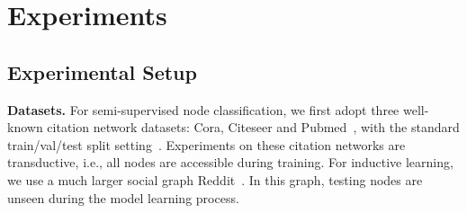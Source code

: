 \vspace{-5pt}
\section{Experiments}\label{sect_exp}
\vspace{-5pt}
\subsection{Experimental Setup}\label{sec_exp_setup}
\vspace{-5pt}
\textbf{Datasets.}
For semi-supervised node classification, we first adopt three well-known citation network datasets: Cora, Citeseer and Pubmed~\citep{sen2008collective}, with the standard train/val/test split setting~\citep{kipf_2017_iclr, yang2016revisiting}.
Experiments on these citation networks are transductive, i.e., all nodes are accessible during training.
For inductive learning, we use a much larger social graph Reddit~\citep{hamilton2017inductive}.
In this graph, testing nodes are unseen during the model learning process.

